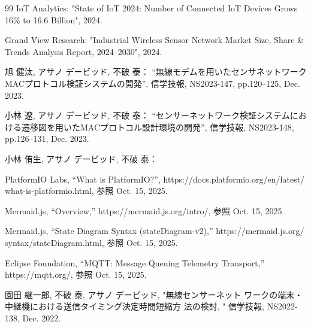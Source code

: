 \documentclass[12pt]{jreport}
\begin{document}



\bunken
\begin{thebibliography}{99}
 IoT Analytics: "State of IoT 2024: Number of Connected IoT Devices Grows 16\% to 16.6 Billion", 2024.  

 Grand View Research: "Industrial Wireless Sensor Network Market Size, Share \& Trends Analysis Report, 2024–2030", 2024.

旭 健汰, アサノ デービッド, 不破 泰：  
“無線モデムを用いたセンサネットワークMACプロトコル検証システムの開発”,  
信学技報,  NS2023-147, pp.120–125, Dec. 2023.


小林 遼, アサノ デービッド, 不破 泰：  
“センサーネットワーク検証システムにおける遷移図を用いたMACプロトコル設計環境の開発”,  
信学技報,  NS2023-148, pp.126–131, Dec. 2023.  

小林 侑生, アサノ デービッド, 不破 泰：

PlatformIO Labs, “What is PlatformIO?”, 
https://docs.platformio.org/en/latest/
what-is-platformio.html, 参照 Oct. 15, 2025.

Mermaid.js, “Overview,” 
https://mermaid.js.org/intro/, 参照 Oct. 15, 2025.

Mermaid.js, “State Diagram Syntax (stateDiagram-v2),” 
https://mermaid.js.org/
syntax/stateDiagram.html, 参照 Oct. 15, 2025.

Eclipse Foundation, “MQTT: Message Queuing Telemetry Transport,” 
https://mqtt.org/, 参照 Oct. 15, 2025.

 園田 継一郎, 不破 泰, アサノ デービッド, "無線センサーネット
ワークの端末・中継機における送信タイミング決定時間短縮方
法の検討, " 信学技報, NS2022-138, Dec. 2022.


\end{thebibliography}
\end{document}
